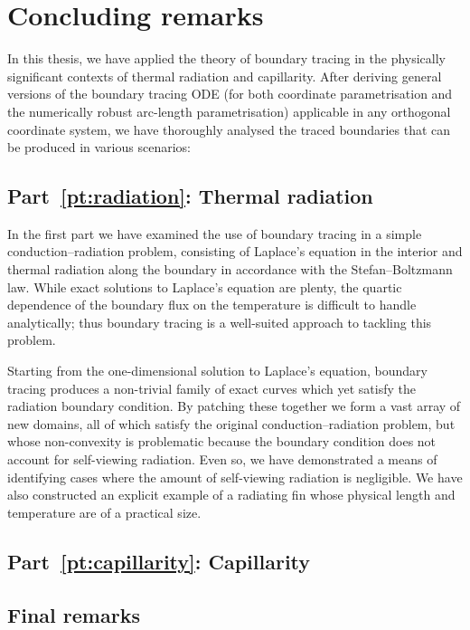 \chapter{Concluding remarks}
\label{ch:concluding}

In this thesis,
we have applied the theory of boundary tracing
in the physically significant contexts
of thermal radiation and capillarity.
After deriving general versions of the boundary tracing ODE
(for both coordinate parametrisation
and the numerically robust arc-length parametrisation)
applicable in any orthogonal coordinate system,
we have thoroughly analysed
the traced boundaries that can be produced in various scenarios:

\section{Part~\ref*{pt:radiation}: Thermal radiation}
\label{sec:concluding.radiation}

In the first part we have examined the use of boundary tracing
in a simple conduction--radiation problem,
consisting of Laplace's equation in the interior
and thermal radiation along the boundary
in accordance with the Stefan--Boltzmann law.
While exact solutions to Laplace's equation are plenty,
the quartic dependence of the boundary flux on the temperature
is difficult to handle analytically;
thus boundary tracing is a well-suited approach to tackling this problem.

Starting from the one-dimensional solution to Laplace's equation,
boundary tracing produces a non-trivial family of exact curves
which yet satisfy the radiation boundary condition.
By patching these together
we form a vast array of new domains,
all of which satisfy the original conduction--radiation problem,
but whose non-convexity is problematic
because the boundary condition does not account for self-viewing radiation.
Even so, we have demonstrated a means of identifying cases
where the amount of self-viewing radiation is negligible.
We have also constructed an explicit example of a radiating fin
whose physical length and temperature are of a practical size.


\section{Part~\ref*{pt:capillarity}: Capillarity}
\label{sec:concluding.capillarity}

\section{Final remarks}
\label{sec:concluding.final}
